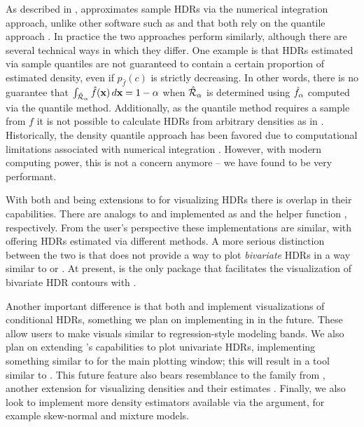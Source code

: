As described in ,  approximates sample HDRs via the numerical integration approach,
unlike other software such as  and  that both rely on the quantile approach \citep{hyndman_computing_1996}.
In practice the two approaches perform similarly, although there are several technical ways in which they differ.
One example is that HDRs estimated via sample quantiles are not guaranteed to contain a certain proportion of estimated density,
even if $p_{\hat{f}}(c)$ is strictly decreasing.
In other words, there is no guarantee that $\int_{\hat{\mathcal{R}}_{\alpha}}\hat{f}(\textbf{x})\,d\textbf{x} = 1 - \alpha$ when $\hat{\mathcal{R}}_{\alpha}$ is determined using $\hat{f}_{\alpha}$ computed via the quantile method.
Additionally, as the quantile method requires a sample from $f$ it is not possible to calculate HDRs from arbitrary densities as in .
Historically, the density quantile approach has been favored due to computational limitations associated with numerical integration \citep{hyndman_computing_1996}.
However, with modern computing power, this is not a concern anymore -- we have found  to be very performant.

With both  and  being extensions to  for visualizing HDRs there is overlap in their capabilities.
There are analogs to  and  implemented as  and the helper function , respectively.
From the user's perspective these implementations are similar, with  offering HDRs estimated via different methods.
A more serious distinction between the two is that  does not provide a way to plot \emph{bivariate} HDRs in a way similar to  or .
At present,  is the only package that facilitates the visualization of bivariate HDR contours with .

Another important difference is that both  and  implement visualizations of conditional HDRs, something we plan on implementing in  in the future.
These allow users to make visuals similar to regression-style modeling bands.
We also plan on extending 's capabilities to plot univariate HDRs, implementing something similar to  for the main plotting window; this will result in a tool similar to .
This future feature also bears resemblance to the  family from ,
another  extension for visualizing densities and their estimates \citep{ggdist}.
Finally, we also look to implement more density estimators available via the  argument,
for example skew-normal and mixture models.

%
